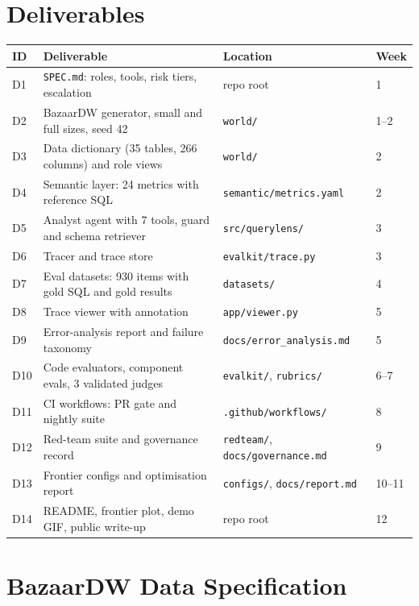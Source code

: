 \documentclass[11pt,a4paper]{article}
\newcommand{\code}[1]{\texttt{\small #1}}
\begin{document}
\section{Deliverables}

\begin{center}
\small
\begin{tabularx}{\linewidth}{@{}l X l l@{}}
\toprule
\textbf{ID} & \textbf{Deliverable} & \textbf{Location} & \textbf{Week}\\
\midrule
D1 & \code{SPEC.md}: roles, tools, risk tiers, escalation & repo root & 1\\
D2 & BazaarDW generator, small and full sizes, seed 42 & \code{world/} & 1--2\\
D3 & Data dictionary (35 tables, 266 columns) and role views & \code{world/} & 2\\
D4 & Semantic layer: 24 metrics with reference SQL & \code{semantic/metrics.yaml} & 2\\
D5 & Analyst agent with 7 tools, guard and schema retriever & \code{src/querylens/} & 3\\
D6 & Tracer and trace store & \code{evalkit/trace.py} & 3\\
D7 & Eval datasets: 930 items with gold SQL and gold results & \code{datasets/} & 4\\
D8 & Trace viewer with annotation & \code{app/viewer.py} & 5\\
D9 & Error-analysis report and failure taxonomy & \code{docs/error\_analysis.md} & 5\\
D10 & Code evaluators, component evals, 3 validated judges & \code{evalkit/}, \code{rubrics/} & 6--7\\
D11 & CI workflows: PR gate and nightly suite & \code{.github/workflows/} & 8\\
D12 & Red-team suite and governance record & \code{redteam/}, \code{docs/governance.md} & 9\\
D13 & Frontier configs and optimisation report & \code{configs/}, \code{docs/report.md} & 10--11\\
D14 & README, frontier plot, demo GIF, public write-up & repo root & 12\\
\bottomrule
\end{tabularx}
\end{center}

\section{BazaarDW Data Specification}
\end{document}
